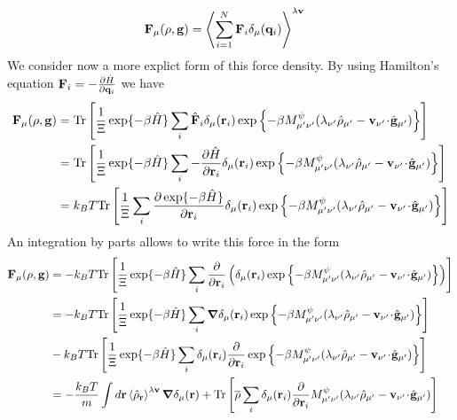 \documentclass[b5paper,openright,11pt]{book}
\newcommand{\esc}{\!\cdot\!}
\newcommand{\llangle}{\left\langle}
\newcommand{\rrangle}{\right\rangle}
\begin{document}
\begin{appendices}
\begin{align}
{\bf F}_\mu(\rho,{\bf g})&=    \llangle \sum_{i=1}^N{\bf F}_i\delta_\mu({\bf q}_i)\rrangle^{\lambda{\bf v}}
\label{Kmuexact}
\end{align}
We consider now a more explict form of this force density. By using Hamilton's equation ${\bf F}_i=-\frac{\partial \hat{H}}{\partial {\bf q}_i}$ we have
\begin{align}
{\bf F}_\mu(\rho,{\bf g})&=  {\rm Tr}\left[\frac{1}{\Xi}\exp\{-\beta \hat{H}\}
\sum_i\hat{\bf F}_i\delta_\mu({\bf r}_i)
\exp\left\{-\beta M^\psi_{\mu'\nu'}(\lambda_{\nu'}\hat{\rho}_{\mu'}-{\bf v}_{\nu'}\esc\hat{\bf g}_{\mu'})\right\}
\right]
\nonumber\\
&=
{\rm Tr}\left[\frac{1}{\Xi}\exp\{-\beta \hat{H}\}
  \sum_i-\frac{\partial \hat{H}}{\partial {\bf r}_i}\delta_\mu({\bf r}_i)\exp\left\{-\beta M^\psi_{\mu'\nu'}(\lambda_{\nu'}\hat{\rho}_{\mu'}-{\bf v}_{\nu'}\esc\hat{\bf g}_{\mu'})\right\}
\right]
\nonumber\\
&= k_BT {\rm Tr}\left[\frac{1}{\Xi}
\sum_i\frac{\partial \exp\{-\beta \hat{H}\}}{\partial {\bf r}_{i}}\delta_\mu({\bf r}_i)\exp\left\{-\beta M^\psi_{\mu'\nu'}(\lambda_{\nu'}\hat{\rho}_{\mu'}-{\bf v}_{\nu'}\esc\hat{\bf g}_{\mu'})\right\}
\right]
\end{align}
An integration by parts allows to write this force in the form
\begin{align}
{\bf F}_\mu(\rho,{\bf g})
&= -k_BT {\rm Tr}\left[\frac{1}{\Xi}\exp\{-\beta \hat{H}\}
\sum_i\frac{\partial }{\partial {\bf r}_i}\left(\delta_\mu({\bf r}_i)\exp\left\{-\beta M^\psi_{\mu'\nu'}(\lambda_{\nu'}\hat{\rho}_{\mu'}-{\bf v}_{\nu'}\esc\hat{\bf g}_{\mu'})\right\}
\right)
\right]
\nonumber\\
&= -k_BT {\rm Tr}\left[\frac{1}{\Xi}\exp\{-\beta \hat{H}\}
\sum_i\boldsymbol{\nabla}\delta_\mu({\bf r}_i)\exp\left\{-\beta M^\psi_{\mu'\nu'}(\lambda_{\nu'}\hat{\rho}_{\mu'}-{\bf v}_{\nu'}\esc\hat{\bf g}_{\mu'})\right\}
\right]
\nonumber\\
& -k_BT {\rm Tr}\left[\frac{1}{\Xi}\exp\{-\beta \hat{H}\}
\sum_i\delta_\mu({\bf r}_i)\frac{\partial }{\partial {\bf r}_i}
\exp\left\{-\beta M^\psi_{\mu'\nu'}(\lambda_{\nu'}\hat{\rho}_{\mu'}-{\bf v}_{\nu'}\esc\hat{\bf g}_{\mu'})\right\}
\right]
\nonumber\\
&= -\frac{k_BT}{m}\int d{\bf r}\llangle\hat{\rho}_{\bf r}\rrangle^{\lambda{\bf v}}
\boldsymbol{\nabla}\delta_\mu({\bf r})
 + {\rm Tr}\left[\overline{\rho}
\sum_i\delta_\mu({\bf r}_i)
\frac{\partial }{\partial {\bf r}_i}
M^\psi_{\mu'\nu'}(\lambda_{\nu'}\hat{\rho}_{\mu'}-{\bf v}_{\nu'}\esc\hat{\bf g}_{\mu'})\right]

\end{align}
\end{appendices}
\end{document}
